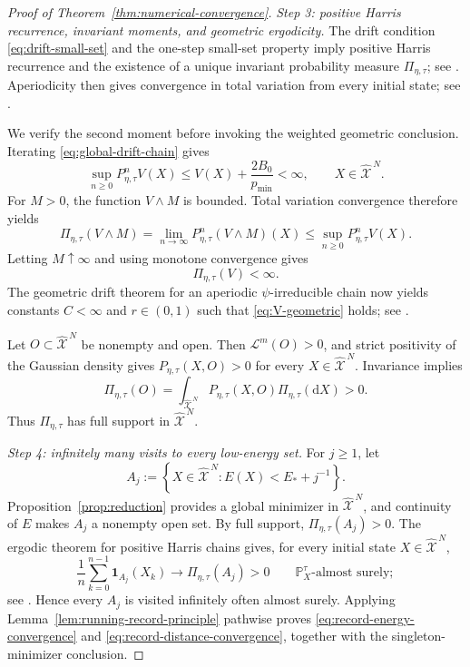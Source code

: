 \documentclass[11pt]{article}
\def\P{\mathbb{P}}
\def\Xc{{\mathcal X}}
\def\id{\mathbf{1}}
\def\hX{\widehat{\Xc}^{\,N}}
\newcommand{\dd}{\mathrm{d}}
\newcommand{\Leb}{\mathcal L}
\newcommand{\pmin}{p_{\min}}
\theoremstyle{definition}
\theoremstyle{remark}
\numberwithin{equation}{section}
\begin{document}
\begin{proof}[Proof of Theorem~\ref{thm:numerical-convergence}]
\smallskip
\noindent\textit{Step 3: positive Harris recurrence, invariant moments, and geometric ergodicity.}
The drift condition \eqref{eq:drift-small-set} and the one-step small-set property imply positive
Harris recurrence and the existence of a unique invariant probability measure
$\Pi_{\eta,\tau}$; see \cite[Theorem~15.0.1]{MeynTweedie2009}.  Aperiodicity then gives convergence
in total variation from every initial state; see
\cite[Theorem~13.3.3]{MeynTweedie2009}.

We verify the second moment before invoking the weighted geometric conclusion.  Iterating
\eqref{eq:global-drift-chain} gives
\begin{equation}\label{eq:iterated-moment-chain}
 \sup_{n\ge0}P_{\eta,\tau}^nV(X)
 \le V(X)+\frac{2B_0}{\pmin}<\infty,
 \qquad X\in\hX.
\end{equation}
For $M>0$, the function $V\wedge M$ is bounded.  Total variation convergence therefore yields
\[
 \Pi_{\eta,\tau}(V\wedge M)
 =\lim_{n\to\infty}P_{\eta,\tau}^n(V\wedge M)(X)
 \le\sup_{n\ge0}P_{\eta,\tau}^nV(X).
\]
Letting $M\uparrow\infty$ and using monotone convergence gives
\begin{equation}\label{eq:invariant-second-moment-chain}
 \Pi_{\eta,\tau}(V)<\infty.
\end{equation}
The geometric drift theorem for an aperiodic $\psi$-irreducible chain now yields constants
$C<\infty$ and $r\in(0,1)$ such that \eqref{eq:V-geometric} holds; see
\cite[Theorem~16.1.2]{MeynTweedie2009}.

Let $O\subset\hX$ be nonempty and open.  Then $\Leb^m(O)>0$, and strict positivity of the Gaussian
density gives $P_{\eta,\tau}(X,O)>0$ for every $X\in\hX$.  Invariance implies
\[
 \Pi_{\eta,\tau}(O)
 =\int_{\hX}P_{\eta,\tau}(X,O)\Pi_{\eta,\tau}(\dd X)>0.
\]
Thus $\Pi_{\eta,\tau}$ has full support in $\hX$.

\smallskip
\noindent\textit{Step 4: infinitely many visits to every low-energy set.}
For $j\ge1$, let
\begin{equation}\label{eq:low-energy-set}
 A_j:=\left\{X\in\hX:E(X)<E_*+j^{-1}\right\}.
\end{equation}
Proposition~\ref{prop:reduction} provides a global minimizer in $\hX$, and continuity of $E$ makes
$A_j$ a nonempty open set.  By full support,
$\Pi_{\eta,\tau}(A_j)>0$.  The ergodic theorem for positive Harris chains gives, for every initial
state $X\in\hX$,
\begin{equation}\label{eq:ergodic-indicator-low-energy}
 \frac1n\sum_{k=0}^{n-1}\id_{A_j}(X_k)
 \longrightarrow\Pi_{\eta,\tau}(A_j)>0
 \qquad\P_X^\tau\text{-almost surely};
\end{equation}
see \cite[Theorem~17.0.1]{MeynTweedie2009}.  Hence every $A_j$ is visited infinitely often almost
surely.  Applying Lemma~\ref{lem:running-record-principle} pathwise proves
\eqref{eq:record-energy-convergence} and \eqref{eq:record-distance-convergence}, together with the
singleton-minimizer conclusion.


\end{proof}
\end{document}
